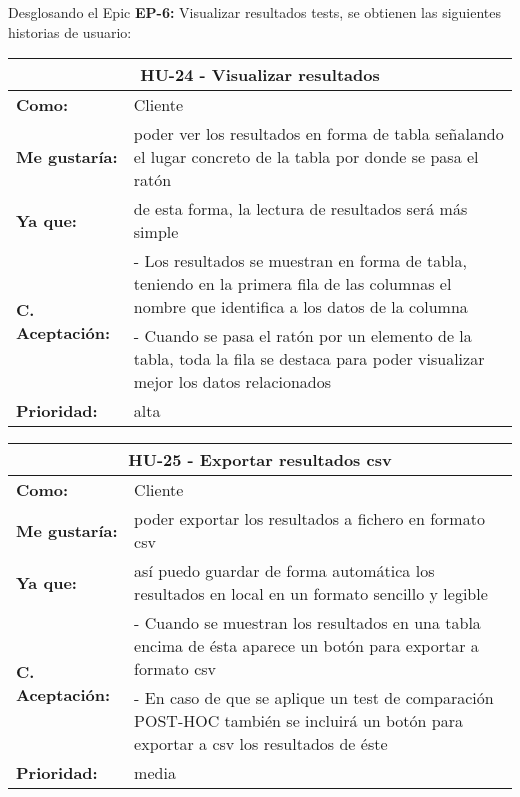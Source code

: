 
Desglosando el Epic \textbf{EP-6:} Visualizar resultados tests, se obtienen las siguientes historias de usuario:

\begin{table}[H]
	\begin{tabular}{| p{3cm}| p{12cm} |}
		\hline
		\multicolumn{2}{|c|}{\textbf{HU-24} - Visualizar resultados} \\ \hline
		\textbf{Como:} & Cliente \\ \hline
		\textbf{Me gustaría:} & poder ver los resultados en forma de tabla señalando el lugar concreto de la tabla por donde se pasa el ratón \\ \hline
		\textbf{Ya que:} & de esta forma, la lectura de resultados será más simple \\ \hline
		\multirow{2}{12cm}{\textbf{C. Aceptación:}} & - Los resultados se muestran en forma de tabla, teniendo en la primera fila de las columnas el nombre que identifica a los datos de la columna \\
		& - Cuando se pasa el ratón por un elemento de la tabla, toda la fila se destaca para poder visualizar mejor los datos relacionados \\ \hline
		\textbf{\textbf{Prioridad:}} & alta \\ \hline
	\end{tabular}
\end{table}


\begin{table}[H]
	\begin{tabular}{| p{3cm}| p{12cm} |}
		\hline
		\multicolumn{2}{|c|}{\textbf{HU-25} - Exportar resultados csv} \\ \hline
		\textbf{Como:} & Cliente \\ \hline
		\textbf{Me gustaría:} & poder exportar los resultados a fichero en formato csv \\ \hline
		\textbf{Ya que:} & así puedo guardar de forma automática los resultados en local en un formato sencillo y legible \\ \hline
		\multirow{2}{12cm}{\textbf{C. Aceptación:}} & - Cuando se muestran los resultados en una tabla encima de ésta aparece un botón para exportar a formato csv \\
		& - En caso de que se aplique un test de comparación POST-HOC también se incluirá un botón para exportar a csv los resultados de éste \\ \hline
		\textbf{\textbf{Prioridad:}} & media \\ \hline
	\end{tabular}
\end{table}

